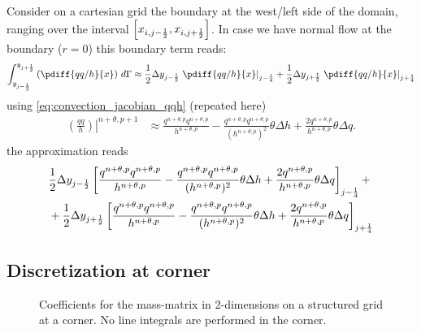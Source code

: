 Consider on a cartesian grid the boundary at the west/left side of the domain, ranging over the interval $\left[ x_{i, j-\frac{1}{2}}, x_{i, j+\frac{1}{2}} \right]$.
In case we have normal flow at the boundary ($r=0$) this boundary term reads:
\begin{align}
    \int^{y_{j+\half}}_{y_{j-\half}}\left(
    \pdiff{qq/h}{x}
    \right) \, d\Gamma \approx
    \half\Dy_{j-\half}\left.\pdiff{qq/h}{x}\right|_{j-\quart} + \half \Dy_{j+\half}\left.\pdiff{qq/h}{x}\right|_{j+\quart}
\end{align}
using \autoref{eq:convection_jacobian_qqh} (repeated here)
\begin{align}
    \left.\left(\frac{qq}{h}\right)\right|^{n+\theta, p+1} &  \approx
    \frac{q^{n+\theta, p}q^{n+\theta, p}}{h^{n+\theta, p}}
    - \frac{q^{n+\theta, p}q^{n+\theta, p}}{(h^{n+\theta, p})^2} \theta\Delta h
    + \frac{2 q^{n+\theta, p}}{h^{n+\theta, p}} \theta\Delta q.
\end{align}
the approximation reads
\begin{align}
    &\frac{1}{2}\Delta y_{j-\frac{1}{2}}\left[\frac{q^{n+\theta, p}q^{n+\theta, p}}{h^{n+\theta, p}}
    - \frac{q^{n+\theta, p}q^{n+\theta, p}}{(h^{n+\theta, p})^2} \theta\Delta h
    +
\frac{2 q^{n+\theta, p}}{h^{n+\theta, p}} \theta\Delta q \right]_{j-\frac{1}{4}} +
    \nonumber \\*
& +
    \frac{1}{2} \Delta y_{j+\frac{1}{2}}\left[\frac{q^{n+\theta, p}q^{n+\theta, p}}{h^{n+\theta, p}}
    - \frac{q^{n+\theta, p}q^{n+\theta, p}}{(h^{n+\theta, p})^2} \theta\Delta h
    +
    \frac{2 q^{n+\theta, p}}{h^{n+\theta, p}} \theta\Delta q \right]_{j+\frac{1}{4}}
\end{align}
\subsection{Discretization at corner}
\begin{figure}[H]
    \begin{center}
        \def\svgwidth{0.8\textwidth} %
        \resizebox{0.65\textwidth}{!}{
            
        }
    \end{center}
    \caption{Coefficients for the mass-matrix in 2-dimensions on a structured grid at a corner. No line integrals are performed in the corner.}
    \label{fig:structured_grid_at_corner}
\end{figure}
